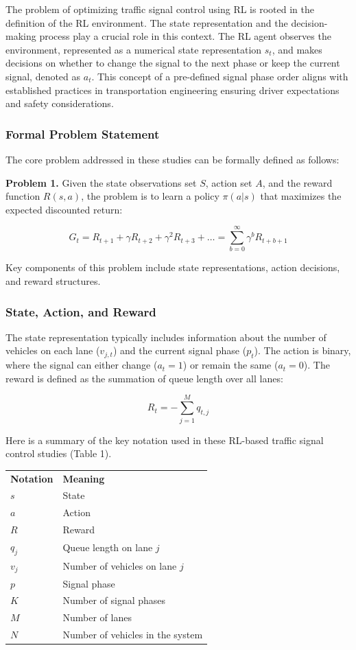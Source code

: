The problem of optimizing traffic signal control using RL is rooted in the definition of the RL environment. The state representation and the decision-making process play a crucial role in this context. The RL agent observes the environment, represented as a numerical state representation $s_t$, and makes decisions on whether to change the signal to the next phase or keep the current signal, denoted as $a_t$. This concept of a pre-defined signal phase order aligns with established practices in transportation engineering  ensuring driver expectations and safety considerations.

\subsubsection{Formal Problem Statement}

The core problem addressed in these studies can be formally defined as follows:

\textbf{Problem 1.} Given the state observations set $S$, action set $A$, and the reward function $R(s, a)$, the problem is to learn a policy $\pi(a|s)$ that maximizes the expected discounted return:

\[
G_t = R_{t+1} + \gamma R_{t+2} + \gamma^2 R_{t+3} + \ldots = \sum_{b=0}^{\infty} \gamma^b R_{t+b+1}
\]

Key components of this problem include state representations, action decisions, and reward structures.

\subsubsection{State, Action, and Reward}

The state representation typically includes information about the number of vehicles on each lane ($v_{j,t}$) and the current signal phase ($p_t$). The action is binary, where the signal can either change ($a_t = 1$) or remain the same ($a_t = 0$). The reward is defined as the summation of queue length over all lanes:

\[
R_t = -\sum_{j=1}^M q_{t, j}
\]

Here is a summary of the key notation used in these RL-based traffic signal control studies (Table 1).

\begin{table}[h]
\centering
\begin{tabular}{ll}
\textbf{Notation} & \textbf{Meaning} \\
$s$ & State \\
$a$ & Action \\
$R$ & Reward \\
$q_j$ & Queue length on lane $j$ \\
$v_j$ & Number of vehicles on lane $j$ \\
$p$ & Signal phase \\
$K$ & Number of signal phases \\
$M$ & Number of lanes \\
$N$ & Number of vehicles in the system \\
\end{tabular}
\end{table}


